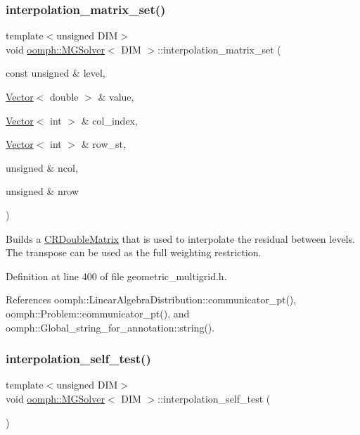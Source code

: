 \subsubsection{\texorpdfstring{interpolation\+\_\+matrix\+\_\+set()}{interpolation\_matrix\_set()}\hspace{0.1cm}{\footnotesize\ttfamily [2/2]}}
{\footnotesize\ttfamily template$<$unsigned D\+IM$>$ \\
void \hyperlink{classoomph_1_1MGSolver}{oomph\+::\+M\+G\+Solver}$<$ D\+IM $>$\+::interpolation\+\_\+matrix\+\_\+set (\begin{DoxyParamCaption}\item[{const unsigned \&}]{level,  }\item[{\hyperlink{classoomph_1_1Vector}{Vector}$<$ double $>$ \&}]{value,  }\item[{\hyperlink{classoomph_1_1Vector}{Vector}$<$ int $>$ \&}]{col\+\_\+index,  }\item[{\hyperlink{classoomph_1_1Vector}{Vector}$<$ int $>$ \&}]{row\+\_\+st,  }\item[{unsigned \&}]{ncol,  }\item[{unsigned \&}]{nrow }\end{DoxyParamCaption})\hspace{0.3cm}{\ttfamily [inline]}}



Builds a \hyperlink{classoomph_1_1CRDoubleMatrix}{C\+R\+Double\+Matrix} that is used to interpolate the residual between levels. The transpose can be used as the full weighting restriction. 



Definition at line 400 of file geometric\+\_\+multigrid.\+h.



References oomph\+::\+Linear\+Algebra\+Distribution\+::communicator\+\_\+pt(), oomph\+::\+Problem\+::communicator\+\_\+pt(), and oomph\+::\+Global\+\_\+string\+\_\+for\+\_\+annotation\+::string().

\mbox{\label{classoomph_1_1MGSolver_a25fbe00e277a8fba8c7f54902b92c417}} 
\subsubsection{\texorpdfstring{interpolation\+\_\+self\+\_\+test()}{interpolation\_self\_test()}}
{\footnotesize\ttfamily template$<$unsigned D\+IM$>$ \\
void \hyperlink{classoomph_1_1MGSolver}{oomph\+::\+M\+G\+Solver}$<$ D\+IM $>$\+::interpolation\+\_\+self\+\_\+test (\begin{DoxyParamCaption}{ }\end{DoxyParamCaption})}



